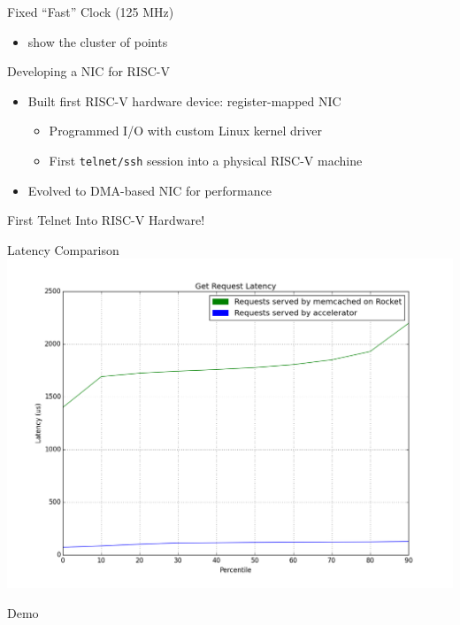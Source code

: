 \documentclass{beamer}
\begin{document}
\begin{frame}{Fixed ``Fast'' Clock (125 MHz)}
    \begin{itemize}
        \item show the cluster of points
    \end{itemize}
\end{frame}





\begin{frame}

    
\end{frame}



\begin{frame}
    
\end{frame}

\begin{frame}{Developing a NIC for RISC-V}
    \begin{itemize}
\item Built first RISC-V hardware device: register-mapped NIC
	\begin{itemize}
	\footnotesize
	\item Programmed I/O with custom Linux kernel driver
	\item First \texttt{telnet/ssh} session into a physical RISC-V machine
	\end{itemize}
\item Evolved to DMA-based NIC for performance
\end{itemize}
\end{frame}

\begin{frame}{First Telnet Into RISC-V Hardware!}
\end{frame}






\begin{frame}{Latency Comparison}
    \includegraphics[width=\linewidth]{../img/graph.png}
\end{frame}

\begin{frame}
    Demo
\end{frame}
\end{document}
